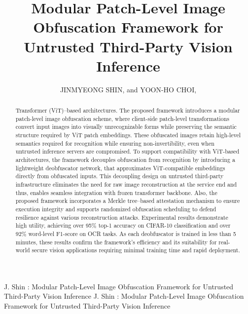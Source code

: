 \documentclass{ieeeaccess}
\begin{document}

\title{Modular Patch-Level Image Obfuscation Framework for Untrusted Third-Party Vision Inference}
\author{\uppercase{Jinmyeong Shin}, and
\uppercase{Yoon-Ho Choi},}

\address[1]{Cloud Security Research Center, Pusan National University, Busan 46241, Republic of Korea}
\address[2]{School of Computer Science and Engineering, Pusan National University, Busan 46241, Republic of Korea}

\markboth
{J. Shin \headeretal: Modular Patch-Level Image Obfuscation Framework for Untrusted Third-Party Vision Inference}
{J. Shin \headeretal: Modular Patch-Level Image Obfuscation Framework for Untrusted Third-Party Vision Inference}



\begin{abstract}
Transformer (ViT)–based architectures. The proposed framework introduces a modular patch-level image obfuscation scheme, where client-side patch-level transformations convert input images into visually unrecognizable forms while preserving the semantic structure required by ViT patch embeddings. These obfuscated images retain high-level semantics required for recognition while ensuring non-invertibility, even when untrusted inference servers are compromised. To support compatibility with ViT-based architectures, the framework decouples obfuscation from recognition by introducing a lightweight deobfuscator network, that approximates ViT-compatible embeddings directly from obfuscated inputs. This decoupling design on untrusted third-party infrastructure eliminates the need for raw image reconstruction at the service end and thus, enables seamless integration with frozen transformer backbone. Also, the proposed framework incorporates a Merkle tree–based attestation mechanism to ensure execution integrity and supports randomized obfuscation scheduling to defend resilience against various reconstruction attacks. Experimental results demonstrate high utility, achieving over 95\% top-1 accuracy on CIFAR-10 classification and over 92\% word-level F1-score on OCR tasks. As each deobfuscator is trained in less than 5 minutes, these results confirm the framework’s efficiency and its suitability for real-world secure vision applications requiring minimal training time and rapid deployment.
\end{abstract}
\end{document}
